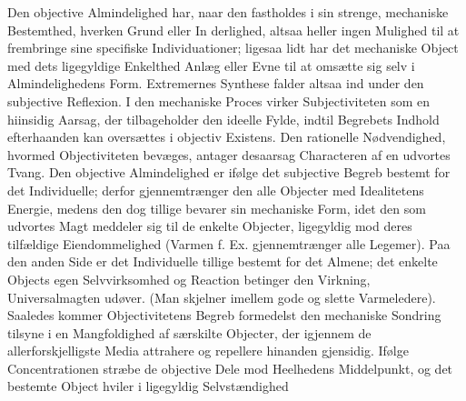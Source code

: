 \documentclass[12pt]{book}
\newcommand{\opage}[1]{\marginnote{\footnotesize\textit{[#1]}}}
\begin{document}
Den objective Almindelighed har, naar den fastholdes i sin strenge, mechaniske
Bestemthed, hverken Grund eller In%
\opage{210}%
%
%
%
%
derlighed, altsaa heller ingen Mulighed til at frembringe sine specifiske
Individuationer; ligesaa lidt har det mechaniske Object med dets ligegyldige Enkelthed
Anlæg eller Evne til at omsætte sig selv i Almindelighedens Form. Extremernes Synthese
falder altsaa ind under den subjective Reflexion. I den mechaniske Proces virker
Subjectiviteten som en hiinsidig Aarsag, der tilbageholder den ideelle Fylde, indtil
Begrebets Indhold efterhaanden kan oversættes i objectiv Existens. Den rationelle
Nødvendighed, hvormed Objectiviteten bevæges, antager desaarsag Characteren af en
udvortes Tvang. Den objective Almindelighed er ifølge det subjective Begreb bestemt for
det Individuelle; derfor gjennemtrænger den alle Objecter med Idealitetens Energie,
medens den dog tillige bevarer sin mechaniske Form, idet den som udvortes Magt meddeler
sig til de enkelte Objecter, ligegyldig mod deres tilfældige Eiendommelighed (Varmen f.
Ex. gjennemtrænger alle Legemer). Paa den anden Side er det Individuelle tillige bestemt
for det Almene; det enkelte Objects egen Selvvirksomhed og Reaction betinger den
Virkning, Universalmagten udøver. (Man skjelner imellem gode og slette Varmeledere).
Saaledes kommer Objectivitetens Begreb formedelst den mechaniske Sondring tilsyne i en
Mangfoldighed af særskilte Objecter, der igjennem de allerforskjelligste Media attrahere
og repellere hinanden gjensidig. Ifølge Concentrationen stræbe de objective Dele mod
Heelhedens Middelpunkt, og det bestemte Object hviler i ligegyldig Selvstændighed
\end{document}
